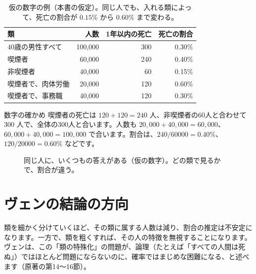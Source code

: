 \documentclass[a4paper,11pt,openany]{ltjsbook}
\begin{document}
\begin{table}[htbp]
\centering
\begin{tabular}{lrrr}
\toprule
類 & 人数 & 1年以内の死亡 & 死亡の割合\\
\midrule
40歳の男性すべて & 100,000 & 300 & 0.30\%\\
喫煙者 & 60,000 & 240 & 0.40\%\\
非喫煙者 & 40,000 & 60 & 0.15\%\\
喫煙者で、肉体労働 & 20,000 & 120 & 0.60\%\\
喫煙者で、事務職 & 40,000 & 120 & 0.30\%\\
\bottomrule
\end{tabular}
\caption{仮の数字の例（本書の仮定）。同じ人でも、入れる類によって、死亡の割合が $0.15\%$ から $0.60\%$ まで変わる。}
\end{table}

\begin{examplebox}{数字の確かめ}
喫煙者の死亡は $120+120=240$ 人、非喫煙者の60人と合わせて $300$ 人で、全体の300人と合います。人数も $20{,}000+40{,}000=60{,}000$、$60{,}000+40{,}000=100{,}000$ で合います。割合は、$240/60000=0.40\%$、$120/20000=0.60\%$ などです。
\end{examplebox}

\begin{figure}[htbp]
\centering
{}
\caption{同じ人に、いくつもの答えがある（仮の数字）。どの類で見るかで、割合が違う。}
\end{figure}

\section{ヴェンの結論の方向}

類を細かく分けていくほど、その類に属する人数は減り、割合の推定は不安定になります。一方で、類を粗くすれば、その人の特徴を無視することになります。ヴェンは、この「類の特殊化」の問題が、論理（たとえば「すべての人間は死ぬ」）ではほとんど問題にならないのに、確率ではまじめな困難になる、と述べます（原著の第14〜16節）。
\end{document}

